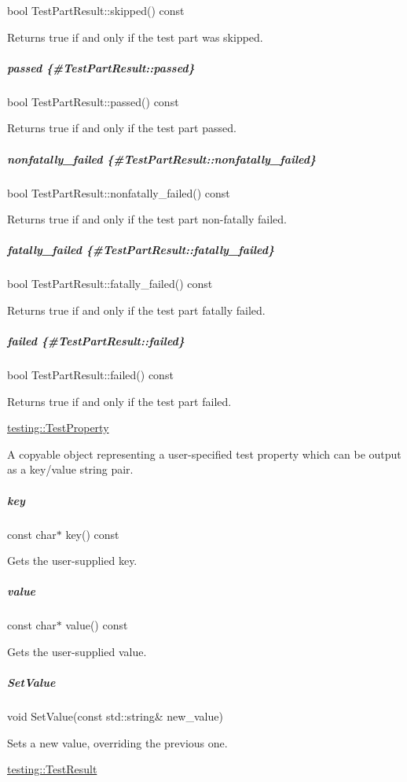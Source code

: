 {\ttfamily bool Test\+Part\+Result\+::skipped() const}

Returns true if and only if the test part was skipped.

\subparagraph*{passed \{\#\+Test\+Part\+Result\+::passed\}}

{\ttfamily bool Test\+Part\+Result\+::passed() const}

Returns true if and only if the test part passed.

\subparagraph*{nonfatally\+\_\+failed \{\#\+Test\+Part\+Result\+::nonfatally\+\_\+failed\}}

{\ttfamily bool Test\+Part\+Result\+::nonfatally\+\_\+failed() const}

Returns true if and only if the test part non-\/fatally failed.

\subparagraph*{fatally\+\_\+failed \{\#\+Test\+Part\+Result\+::fatally\+\_\+failed\}}

{\ttfamily bool Test\+Part\+Result\+::fatally\+\_\+failed() const}

Returns true if and only if the test part fatally failed.

\subparagraph*{failed \{\#\+Test\+Part\+Result\+::failed\}}

{\ttfamily bool Test\+Part\+Result\+::failed() const}

Returns true if and only if the test part failed.

{\ttfamily \mbox{\hyperlink{classtesting_1_1TestProperty}{testing\+::\+Test\+Property}}}

A copyable object representing a user-\/specified test property which can be output as a key/value string pair.

\label{invalid_invalid}%
%
\subparagraph*{key}

{\ttfamily const char$\ast$ key() const}

Gets the user-\/supplied key.

\label{invalid_invalid}%
%
\subparagraph*{value}

{\ttfamily const char$\ast$ value() const}

Gets the user-\/supplied value.

\label{invalid_invalid}%
%
\subparagraph*{Set\+Value}

{\ttfamily void Set\+Value(const std\+::string\& new\+\_\+value)}

Sets a new value, overriding the previous one.

{\ttfamily \mbox{\hyperlink{classtesting_1_1TestResult}{testing\+::\+Test\+Result}}}

